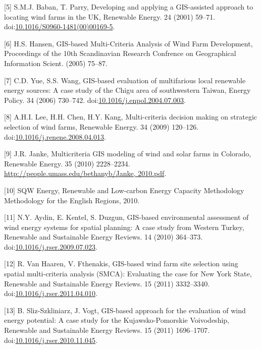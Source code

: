 \documentclass[a4paper,]{article}
\theoremstyle{definition}
\theoremstyle{definition}
\theoremstyle{definition}
\theoremstyle{remark}
\begin{document}
\hypertarget{ref-Baban2001}{}
{[}5{]} S.M.J. Baban, T. Parry, Developing and applying a GIS-assisted
approach to locating wind farms in the UK, Renewable Energy. 24 (2001)
59--71.
doi:\href{https://doi.org/10.1016/S0960-1481(00)00169-5}{10.1016/S0960-1481(00)00169-5}.

\hypertarget{ref-Hansen2005}{}
{[}6{]} H.S. Hansen, GIS-based Multi-Criteria Analysis of Wind Farm
Development, Proceedings of the 10th Scandinavian Research Confrence on
Geographical Information Scient. (2005) 75--87.

\hypertarget{ref-Yue2006}{}
{[}7{]} C.D. Yue, S.S. Wang, GIS-based evaluation of multifarious local
renewable energy sources: A case study of the Chigu area of southwestern
Taiwan, Energy Policy. 34 (2006) 730--742.
doi:\href{https://doi.org/10.1016/j.enpol.2004.07.003}{10.1016/j.enpol.2004.07.003}.

\hypertarget{ref-Lee2009}{}
{[}8{]} A.H.I. Lee, H.H. Chen, H.Y. Kang, Multi-criteria decision making
on strategic selection of wind farms, Renewable Energy. 34 (2009)
120--126.
doi:\href{https://doi.org/10.1016/j.renene.2008.04.013}{10.1016/j.renene.2008.04.013}.

\hypertarget{ref-Janke2010}{}
{[}9{]} J.R. Janke, Multicriteria GIS modeling of wind and solar farms
in Colorado, Renewable Energy. 35 (2010) 2228--2234.
\href{http://people.umass.edu/bethanyb/Janke,\%202010.pdf}{http://people.umass.edu/bethanyb/Janke, 2010.pdf}.

\hypertarget{ref-SQWEnergy2010}{}
{[}10{]} SQW Energy, Renewable and Low-carbon Energy Capacity
Methodology Methodology for the English Regions, 2010.

\hypertarget{ref-Aydin2010}{}
{[}11{]} N.Y. Aydin, E. Kentel, S. Duzgun, GIS-based environmental
assessment of wind energy systems for spatial planning: A case study
from Western Turkey, Renewable and Sustainable Energy Reviews. 14 (2010)
364--373.
doi:\href{https://doi.org/10.1016/j.rser.2009.07.023}{10.1016/j.rser.2009.07.023}.

\hypertarget{ref-VanHaaren2011}{}
{[}12{]} R. Van Haaren, V. Fthenakis, GIS-based wind farm site selection
using spatial multi-criteria analysis (SMCA): Evaluating the case for
New York State, Renewable and Sustainable Energy Reviews. 15 (2011)
3332--3340.
doi:\href{https://doi.org/10.1016/j.rser.2011.04.010}{10.1016/j.rser.2011.04.010}.

\hypertarget{ref-Sliz-Szkliniarz2011}{}
{[}13{]} B. Sliz-Szkliniarz, J. Vogt, GIS-based approach for the
evaluation of wind energy potential: A case study for the
Kujawsko-Pomorskie Voivodeship, Renewable and Sustainable Energy
Reviews. 15 (2011) 1696--1707.
doi:\href{https://doi.org/10.1016/j.rser.2010.11.045}{10.1016/j.rser.2010.11.045}.
\end{document}
